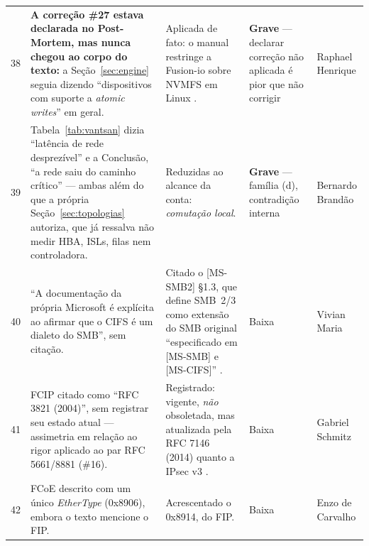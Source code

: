 \documentclass[11pt,a4paper]{article}
\begin{document}
{\begin{longtable}{@{}p{0.35cm}p{4.6cm}p{5.5cm}p{2.0cm}p{2.0cm}@{}}
38 & \textbf{A correção \#27 estava declarada no Post-Mortem, mas nunca chegou ao corpo do texto:} a
Seção~\ref{sec:engine} seguia dizendo ``dispositivos com suporte a \textit{atomic writes}'' em geral.
& Aplicada de fato: o manual restringe a Fusion-io sobre NVMFS em Linux \cite{mysqldw}. &
\textbf{Grave} --- declarar correção não aplicada é pior que não corrigir & Raphael Henrique \\

39 & Tabela~\ref{tab:vantsan} dizia ``latência de rede desprezível'' e a Conclusão, ``a rede saiu do
caminho crítico'' --- ambas além do que a própria Seção~\ref{sec:topologias} autoriza, que já
ressalva não medir HBA, ISLs, filas nem controladora. & Reduzidas ao alcance da conta:
\emph{comutação local}. & \textbf{Grave} --- família (d), contradição interna & Bernardo Brandão \\

40 & ``A documentação da própria Microsoft é explícita ao afirmar que o CIFS é um dialeto do SMB'',
sem citação. & Citado o [MS-SMB2] §1.3, que define SMB~2/3 como extensão do SMB original
``especificado em [MS-SMB] e [MS-CIFS]'' \cite{mssmb2ovw}. & Baixa & Vivian Maria \\

41 & FCIP citado como ``RFC 3821 (2004)'', sem registrar seu estado atual --- assimetria em relação
ao rigor aplicado ao par RFC 5661/8881 (\#16). & Registrado: vigente, \emph{não} obsoletada, mas
atualizada pela RFC 7146 (2014) quanto a IPsec v3 \cite{rfc7146}. & Baixa & Gabriel Schmitz \\

42 & FCoE descrito com um único \textit{EtherType} (0x8906), embora o texto mencione o FIP. &
Acrescentado o 0x8914, do FIP. & Baixa & Enzo de Carvalho \\
\end{longtable}}
\end{document}
